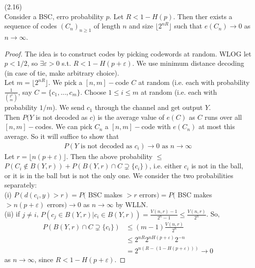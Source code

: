 \documentclass[a4paper]{article}
\begin{document}
\begin{prop} (2.16)\\
Consider a BSC, erro probability $p$. Let $R < 1-H(p)$. Then ther exists a sequence of codes $(C_n)_{n \geq 1}$ of length $n$ and size $\lfloor 2^{nR}\rfloor$ such that $e(C_n) \to 0$ as $n \to \infty$.
\begin{proof}
The idea is to construct codes by picking codewords at random. WLOG let $p<1/2$, so $\exists \varepsilon>0$ s.t. $R<1-H(p+\varepsilon)$. We use minimum distance decoding (in case of tie, make arbitrary choice).\\
Let $m = \lfloor 2^{nR}\rfloor$. We pick a $[n,m]-$code $C$ at random (i.e. each with probability $\frac{1}{{2^n \choose m}}$, say $C=\{c_1,...,c_m\}$. Choose $1 \leq i \leq m$ at random (i.e. each with probability $1/m$). We send $c_1$ through the channel and get output $Y$.\\
Then $P(Y$ is not decoded as $c)$ is the average value of $e(C)$ as $C$ runs over all $[n,m]-$codes. We can pick $C_n$ a $[n,m]-$code with $e(C_n)$ at most this average. So it will suffice to show that
\begin{equation*}
\begin{aligned}
P(Y \text{ is not decoded as } c_i) \to 0 \text{ as }n \to \infty
\end{aligned}
\end{equation*}
Let $r = \lfloor n(p+\varepsilon)\rfloor$. Then the above probability $\leq$ $P(C_i \not\in B(Y,r)) + P(B(Y,r) \cap C \supsetneq \{c_i\})$, i.e. either $c_i$ is not in the ball, or it is in the ball but is not the only one. We consider the two probabilities separately:\\
(i) $P(d(c_i,y) > r) = P($ BSC makes $>r$ errors$) = P($ BSC makes $>n(p+\varepsilon)$ errors$) \to 0$ as $n \to \infty$ by WLLN. \\
(ii) if $j \neq i$, $P(c_j \in B(Y,r) | c_i \in B(Y,r)) = \frac{V(n,r) - 1}{2^n-1} \leq \frac{V(n,r)}{2^n}$. So,
\begin{equation*}
\begin{aligned}
P(B(Y,r) \cap C \supsetneq \{c_i\}) &\leq (m-1) \frac{V(n,r)}{2^n}\\
&\leq 2^{nR} 2^{nH(p+\varepsilon)} 2^{-n}\\
&= 2^{n(R-(1-H(p+\varepsilon)))} \to 0
\end{aligned}
\end{equation*}
as $n \to \infty$, since $R<1-H(p+\varepsilon)$.
\end{proof}
\end{prop}
\end{document}

